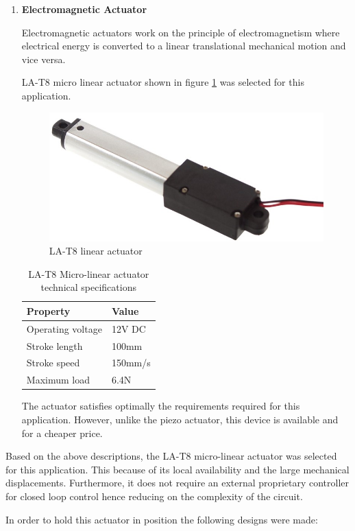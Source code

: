 \begin{enumerate}
    \item \textbf{Electromagnetic Actuator}
    \par
    Electromagnetic actuators work on the principle of electromagnetism where electrical energy is converted to a linear translational mechanical motion and vice versa.
    \par
     LA-T8 micro linear actuator shown in figure \ref{fig:la_t8_linear_actuator}  was selected for this application.
    \begin{figure}[H]
        \centering
        \includegraphics[width=.25\textwidth, height=.25\textheight]{Figures/LA-T8.jpg}
        \caption[LA-T8 linear actuator]{LA-T8 linear actuator \cite{la_t8}}
        \label{fig:la_t8_linear_actuator}
    \end{figure}
    \begin{table}[H]
    \centering
       \caption[LA-T8 Micro-linear actuator technical specifications]{LA-T8 Micro-linear actuator technical specifications \cite{la_t8}}
    \begin{tabular}{|l|l|}
    \hline
    \textbf{Property} & \textbf{Value} \\ \hline
    Operating voltage & 12V DC \\ \hline
    Stroke length & 100mm \\ \hline
    Stroke speed & 150mm/s \\ \hline
    Maximum load & 6.4N \\ \hline
    \end{tabular}
    
    \label{tab:la_t8_tab}
    \end{table}
    The actuator satisfies optimally the requirements required for this application. However, unlike the piezo actuator, this device is available and for a cheaper price.
\end{enumerate}
Based on the above descriptions, the LA-T8 micro-linear actuator was selected for this application. This because of its local availability and the large mechanical displacements. Furthermore, it does not require an external proprietary controller for closed loop control hence reducing on the complexity of the circuit.
\par
In order to hold this actuator in position the following designs were made:

